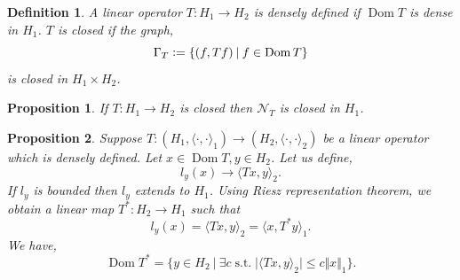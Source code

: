 \documentclass{article}
\newtheorem{proposition}{Proposition}[section]
\newtheorem{definition}{Definition}[section]
\DeclareMathOperator{\st}{s.t.}
\DeclareMathOperator{\Dom}{Dom}
\newcommand{\defeq}{\vcentcolon=}
\newcommand{\norm}[1]{\Vert #1 \Vert}
\newcommand{\sep}[0]{\:|\:}
\begin{document}
\begin{definition}
  A linear operator $T:H_1\to H_2$ is densely defined if $\Dom T$ is dense in $H_1$. $T$ is closed if the graph,
  \begin{equation*}
    \Gamma_T \defeq \{(f,Tf)\sep f\in \Dom T\}
  \end{equation*}
  is closed in $H_1\times H_2$.
\end{definition}
\begin{proposition}
  If $T:H_1\to H_2$ is closed then $\mathcal{N}_T$ is closed in $H_1$.
\end{proposition}
\begin{proposition}
  Suppose $T:(H_1,\langle\cdot,\cdot\rangle_1)\to (H_2,\langle\cdot,\cdot\rangle_2)$ be a linear operator which is densely defined. Let $x\in\Dom T,y\in H_2$. Let us define,
  \begin{equation*}
    l_y(x)\to \langle Tx,y\rangle_2.
  \end{equation*}
  If $l_y$ is bounded then $l_y$ extends to $H_1$. Using Riesz representation theorem, we obtain a linear map $T^*:H_2\to H_1$ such that 
  \begin{equation*}
    l_y(x) = \langle Tx,y\rangle_2 = \langle x,T^*y\rangle_1.
  \end{equation*}
  We have,
  \begin{equation*}
    \Dom T^* = \{y\in H_2\sep \exists c \st \vert\langle Tx,y\rangle_2\vert\leq c\norm{x}_1\}.
  \end{equation*}
\end{proposition}
\end{document}

